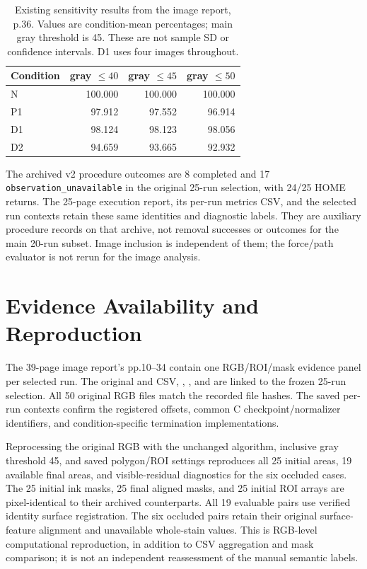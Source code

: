 \begin{table}[tbp]\centering\small
\caption[Archived E3 threshold sensitivity]{Existing sensitivity results from the image report, p.36. Values are condition-mean percentages; main gray threshold is 45. These are not sample SD or confidence intervals. D1 uses four images throughout.}
\label{tab:e3_sensitivity}
\begin{tabular}{lrrr}\toprule
Condition & gray \(\leq40\) & gray \(\leq45\) & gray \(\leq50\) \\ \midrule
N & 100.000 & 100.000 & 100.000 \\
P1 & 97.912 & 97.552 & 96.914 \\
D1 & 98.124 & 98.123 & 98.056 \\
D2 & 94.659 & 93.665 & 92.932 \\
\bottomrule\end{tabular}
\end{table}

The archived v2 procedure outcomes are 8 completed and 17 \texttt{observation\_unavailable} in the original 25-run selection, with 24/25 HOME returns. The 25-page execution report, its per-run metrics CSV, and the selected run contexts retain these same identities and diagnostic labels. They are auxiliary procedure records on that archive, not removal successes or outcomes for the main 20-run subset. Image inclusion is independent of them; the force/path evaluator is not rerun for the image analysis.

\section{Evidence Availability and Reproduction}
The 39-page image report's pp.10--34 contain one RGB/ROI/mask evidence panel per selected run. The original  and CSV, , , and  are linked to the frozen 25-run selection. All 50 original RGB files match the recorded file hashes. The saved per-run contexts confirm the registered offsets, common C checkpoint/normalizer identifiers, and condition-specific termination implementations.

Reprocessing the original RGB with the unchanged algorithm, inclusive gray threshold 45, and saved polygon/ROI settings reproduces all 25 initial areas, 19 available final areas, and visible-residual diagnostics for the six occluded cases. The 25 initial ink masks, 25 final aligned masks, and 25 initial ROI arrays are pixel-identical to their archived counterparts. All 19 evaluable pairs use verified identity surface registration. The six occluded pairs retain their original surface-feature alignment and unavailable whole-stain values. This is RGB-level computational reproduction, in addition to CSV aggregation and mask comparison; it is not an independent reassessment of the manual semantic labels.


